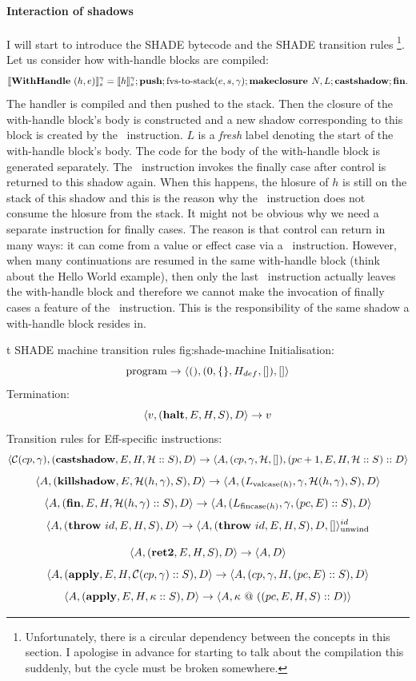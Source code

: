 \documentclass[class=article, crop=false]{standalone}
\begin{document}
\paragraph{Interaction of shadows}
I will start to introduce the SHADE bytecode and the SHADE transition rules%
\footnote{Unfortunately, there is a circular dependency between the concepts in this
section. I apologise in advance for starting to talk about the compilation
this suddenly, but the cycle must be broken somewhere.}. Let us consider how
with-handle blocks are compiled:
$$ \interp{\irWithHandle\ (h, e)}_s ^ \gamma = \interp{h}_s ^ \gamma; \vmPush; \text{fvs-to-stack}(e, s, \gamma); \vmMakeClosure{N}{L}; \shCastShadow; \shFin.$$
The handler is compiled and then pushed to the stack. Then the closure of
the with-handle block's body is constructed and a new shadow corresponding to
this block is created by the \vmCastShadow\ instruction. $L$ is a \emph{fresh} label
denoting the start of the with-handle block's body. The code for the body of
the with-handle block is generated separately. The \vmFin\ instruction invokes
the finally case after control is returned to this shadow again. When this
happens, the hlosure of $h$ is still on the stack of this shadow and this is
the reason why the \vmCastShadow\ instruction does not consume the hlosure from
the stack. It might not be obvious why we need a separate instruction for
finally cases. The reason is that control can return in many ways: it can come
from a value or effect case via a \vmRett\ instruction. However, when many
continuations are resumed in the same with-handle block (think about the Hello
World example), then only the last \vmRett\ instruction actually leaves the
with-handle block and therefore we cannot make the invocation of finally cases
a feature of the \vmRett\ instruction. This is the responsibility of the same
shadow a with-handle block resides in.

\begin{myfigure}[0.95]{t}
{SHADE machine transition rules}
{fig:shade-machine}
%
Initialisation:
$$\text{program} \to \langle \mathbf{()}, (0, \{\}, H_{def}, []), [] \rangle$$
%
Termination:
$$ \langle v, (\mathbf{halt}, E, H, S), D \rangle \to v $$
%
Transition rules for Eff-specific instructions:
$$ \langle \mathcal{C}(cp, \gamma), (\mathbf{castshadow}, E, H, \mathcal{H} :: S), D \rangle \to \langle A, (cp, \gamma, \mathcal{H}, []), (pc+1, E, H, \mathcal{H} :: S) :: D \rangle $$
$$ \langle A, (\mathbf{killshadow}, E, \mathcal{H}(h, \gamma), S), D \rangle \to  \langle A, (L_{\text{valcase}(h)}, \gamma, \mathcal{H}(h, \gamma),S), D \rangle $$
$$ \langle A, (\mathbf{fin}, E, H, \mathcal{H}(h, \gamma) :: S), D \rangle \to \langle A, (L_{\text{fincase}(h)}, \gamma, (pc, E) :: S), D \rangle $$
$$ \langle A, (\mathbf{throw}\ id, E, H, S), D \rangle \to \langle A, (\mathbf{throw}\ id, E, H, S), D, [] \rangle_\text{unwind}^{id} $$

$$ \langle A, (\mathbf{ret2}, E, H, S), D \rangle \to \langle A, D \rangle $$
$$ \langle A, (\mathbf{apply}, E, H, \mathcal{C}(cp, \gamma) :: S), D \rangle \to \langle A, (cp, \gamma, H, (pc, E) :: S), D \rangle $$
$$ \langle A, (\mathbf{apply}, E, H, \kappa :: S), D \rangle \to \langle A, \kappa\ @\ ((pc, E, H, S) :: D) \rangle $$
\end{myfigure}
\end{document}
